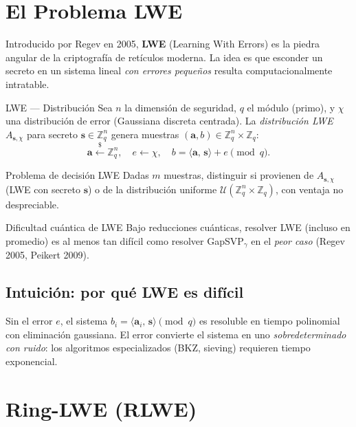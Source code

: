 \documentclass[12pt,a4paper,twoside,openright]{book}
\theoremstyle{plain}
\theoremstyle{definition}
\theoremstyle{remark}
\newcommand{\Zq}{\mathbb{Z}_q}
\newcommand{\vv}[1]{\mathbf{#1}}
\newcommand{\inner}[2]{\langle #1,\, #2 \rangle}
\begin{document}
\section{El Problema LWE}

Introducido por Regev en 2005, \textbf{LWE} (Learning With Errors) es la
piedra angular de la criptograf\'ia de ret\'iculos moderna. La idea es que
esconder un secreto en un sistema lineal \emph{con errores peque\~nos}
resulta computacionalmente intratable.

\begin{midef}{LWE --- Distribuci\'on}
  Sea $n$ la dimensi\'on de seguridad, $q$ el m\'odulo (primo), y
  $\chi$ una distribuci\'on de error (Gaussiana discreta centrada). La
  \emph{distribuci\'on LWE} $A_{\vv{s},\chi}$ para secreto
  $\vv{s} \in \Zq^n$ genera muestras $(\vv{a}, b) \in \Zq^n \times \Zq$:
  \[
    \vv{a} \xleftarrow{\$} \Zq^n, \quad
    e \leftarrow \chi, \quad
    b = \inner{\vv{a}}{\vv{s}} + e \pmod{q}.
  \]
\end{midef}

\begin{midef}{Problema de decisi\'on LWE}
  Dadas $m$ muestras, distinguir si provienen de $A_{\vv{s},\chi}$
  (LWE con secreto $\vv{s}$) o de la distribuci\'on uniforme
  $\mathcal{U}(\Zq^n \times \Zq)$, con ventaja no despreciable.
\end{midef}

\begin{miteo}{Dificultad cu\'antica de LWE}
  Bajo reducciones cu\'anticas, resolver LWE (incluso en promedio) es al
  menos tan dif\'icil como resolver GapSVP$_\gamma$ en el \emph{peor caso}
  (Regev 2005, Peikert 2009).
\end{miteo}

\subsection{Intuici\'on: por qu\'e LWE es dif\'icil}

Sin el error $e$, el sistema $b_i = \inner{\vv{a}_i}{\vv{s}} \pmod{q}$ es
resoluble en tiempo polinomial con eliminaci\'on gaussiana. El error convierte
el sistema en uno \emph{sobredeterminado con ruido}: los algoritmos
especializados (BKZ, sieving) requieren tiempo exponencial.

\section{Ring-LWE (RLWE)}
\end{document}
